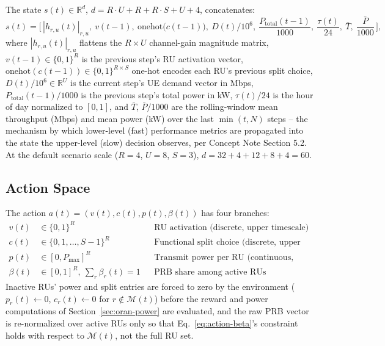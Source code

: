 The state $s(t) \in \mathbb{R}^{d}$, $d = R{\cdot}U + R + R{\cdot}S + U + 4$, concatenates:
\begin{equation}
  s(t) = \Big[\, |h_{r,u}(t)|_{r,u} ,\ v(t-1) ,\ \mathrm{onehot}\big(c(t-1)\big) ,\ D(t)/10^6 ,\ \frac{P_{\mathrm{total}}(t-1)}{1000} ,\ \frac{\tau(t)}{24} ,\ \bar{T} ,\ \frac{\bar{P}}{1000} \,\Big],
  \label{eq:oran-state}
\end{equation}
where $|h_{r,u}(t)|_{r,u}$ flattens the $R \times U$ channel-gain magnitude
matrix, $v(t-1) \in \{0,1\}^R$ is the previous step's RU activation vector,
$\mathrm{onehot}(c(t-1)) \in \{0,1\}^{R\times S}$ one-hot encodes each RU's
previous split choice, $D(t)/10^6 \in \mathbb{R}^U$ is the current step's
UE demand vector in Mbps, $P_{\mathrm{total}}(t-1)/1000$ is the previous
step's total power in kW, $\tau(t)/24$ is the hour of day normalized to
$[0,1]$, and $\bar{T}$, $\bar{P}/1000$ are the rolling-window mean
throughput (Mbps) and mean power (kW) over the last
$\min(t, N)$ steps -- the mechanism by which lower-level (fast) performance
metrics are propagated into the state the upper-level (slow) decision
observes, per Concept Note Section 5.2. At the default scenario scale
($R=4$, $U=8$, $S=3$), $d = 32 + 4 + 12 + 8 + 4 = 60$.

\subsection{Action Space}

The action $a(t) = (v(t), c(t), p(t), \beta(t))$ has four branches:
\begin{align}
  v(t) &\in \{0,1\}^R && \text{RU activation (discrete, upper timescale)} \label{eq:action-v}\\
  c(t) &\in \{0,1,\dots,S-1\}^R && \text{Functional split choice (discrete, upper timescale)} \label{eq:action-c}\\
  p(t) &\in [0, P_{\max}]^R && \text{Transmit power per RU (continuous, lower timescale)} \label{eq:action-p}\\
  \beta(t) &\in [0,1]^R,\ \textstyle\sum_r \beta_r(t) = 1 && \text{PRB share among active RUs (continuous, lower timescale)} \label{eq:action-beta}
\end{align}
Inactive RUs' power and split entries are forced to zero by the
environment ($p_r(t) \gets 0$, $c_r(t) \gets 0$ for $r \notin \mathcal{M}(t)$)
before the reward and power computations of Section~\ref{sec:oran-power}
are evaluated, and the raw PRB vector is re-normalized over active RUs
only so that Eq.~\ref{eq:action-beta}'s constraint holds with respect to
$\mathcal{M}(t)$, not the full RU set.

